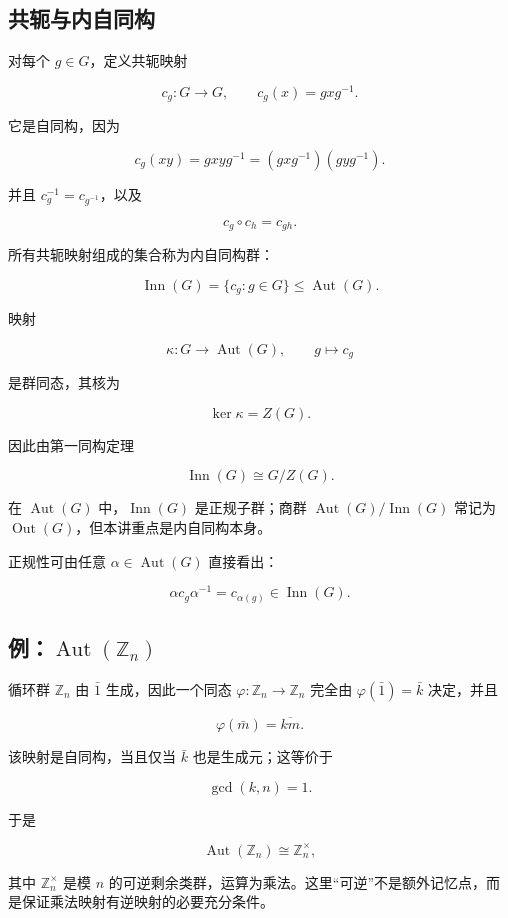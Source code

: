 \subsection{共轭与内自同构}


对每个 $g\in G$，定义共轭映射

\[
 c_g:G\to G,\qquad c_g(x)=gxg^{-1}.
\]

它是自同构，因为

\[
 c_g(xy)=gxyg^{-1}=(gxg^{-1})(gyg^{-1}).
\]

并且 $c_g^{-1}=c_{g^{-1}}$，以及

\[
c_g\circ c_h=c_{gh}.
\]

所有共轭映射组成的集合称为内自同构群：

\[
\operatorname{Inn}(G)=\{c_g:g\in G\}\le \operatorname{Aut}(G).
\]

映射

\[
\kappa:G\longrightarrow\operatorname{Aut}(G),
\qquad g\longmapsto c_g
\]

是群同态，其核为

\[
\ker\kappa=Z(G).
\]

因此由第一同构定理

\[
\operatorname{Inn}(G)\cong G/Z(G).
\]

在 $\operatorname{Aut}(G)$ 中，$\operatorname{Inn}(G)$ 是正规子群；商群 $\operatorname{Aut}(G)/\operatorname{Inn}(G)$ 常记为 $\operatorname{Out}(G)$，但本讲重点是内自同构本身。

正规性可由任意 $\alpha\in\operatorname{Aut}(G)$ 直接看出：

\[
\alpha c_g\alpha^{-1}=c_{\alpha(g)}\in\operatorname{Inn}(G).
\]

\subsection{例：$\operatorname{Aut}(\mathbb Z_n)$}


循环群 $\mathbb Z_n$ 由 $\bar 1$ 生成，因此一个同态 $\varphi:\mathbb Z_n\to\mathbb Z_n$ 完全由 $\varphi(\bar 1)=\bar k$ 决定，并且

\[
\varphi(\bar m)=\overline{km}.
\]

该映射是自同构，当且仅当 $\bar k$ 也是生成元；这等价于

\[
\gcd(k,n)=1.
\]

于是

\[
\operatorname{Aut}(\mathbb Z_n)\cong \mathbb Z_n^\times,
\]

其中 $\mathbb Z_n^\times$ 是模 $n$ 的可逆剩余类群，运算为乘法。这里“可逆”不是额外记忆点，而是保证乘法映射有逆映射的必要充分条件。

